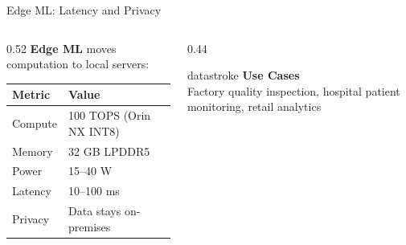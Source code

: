 \documentclass[aspectratio=169, 12pt]{beamer}
\begin{document}
\begin{frame}{Edge ML: Latency and Privacy}
\note{
%
%
%
%
%
}

\small
\begin{columns}[T]
  \begin{column}{0.52\textwidth}
    \textbf{Edge ML} moves computation to local servers:

    \vspace{0.15cm}
    {\footnotesize
    \renewcommand{\arraystretch}{1.15}
    \begin{tabular}{@{}ll@{}}
      \toprule
      \textbf{Metric} & \textbf{Value} \\
      \midrule
      Compute    & 100 TOPS (Orin NX INT8) \\
      Memory     & 32 GB LPDDR5 \\
      Power      & 15--40 W \\
      Latency    & 10--100 ms \\
      Privacy    & Data stays on-premises \\
      \bottomrule
    \end{tabular}
    }

    \vspace{0.15cm}
  \end{column}
  \begin{column}{0.44\textwidth}
    \vspace{0.2cm}
    \begin{mlsyscard}{datastroke}
    \textbf{Use Cases}\\
    {\footnotesize Factory quality inspection, hospital patient monitoring, retail analytics}
    \end{mlsyscard}


\end{column}
\end{columns}
\end{frame}
\end{document}

